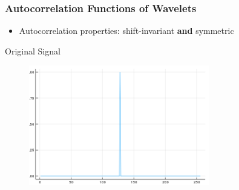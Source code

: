 \documentclass[aspectratio=169]{beamer}
\begin{document}
\begin{frame}
\frametitle{Autocorrelation Functions of Wavelets}
    \begin{itemize}
        \item Autocorrelation properties: shift-invariant \textbf{and} symmetric
    \end{itemize}
    Original Signal
    \begin{figure}
        \centering
        \includegraphics[height=0.1\textheight, width=0.7\textwidth]{spike_signal.png}
    \end{figure}


\end{frame}
\end{document}
